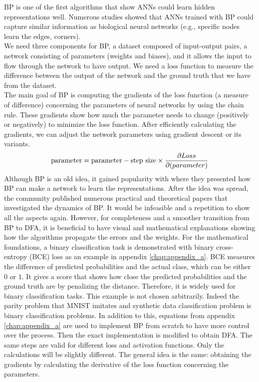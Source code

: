 \documentclass[a4paper, nobind]{templates/ociamthesis}
\begin{document}
BP is one of the first algorithms that show ANNs could learn hidden representations well. Numerous studies showed that ANNs trained with BP could capture similar information as biological neural networks (e.g., specific nodes learn the edges, corners).\\
We need three components for BP, a dataset composed of input-output pairs, a network consisting of parameters (weights and biases), and it allows the input to flow through the network to have output. We need a loss function to measure the difference between the output of the network and the ground truth that we have from the dataset.\\
The main goal of BP is computing the gradients of the loss function (a measure of difference) concerning the parameters of neural networks by using the chain rule. These gradients show how much the parameter needs to change (positively or negatively) to minimize the loss function. After efficiently calculating the gradients, we can adjust the network parameters using gradient descent or its variants.
\[
\begin{aligned} 
\text{parameter} &= \text{parameter} - \text{step size} \times \frac{\partial Loss}{\partial \text(parameter)}  \\
\end{aligned}
\]
\noindent Although BP is an old idea, it gained popularity with \cite{Rumelhart:1986we} where they presented how BP can make a network to learn the representations. After the idea was spread, the community published numerous practical and theoretical papers that investigated the dynamics of BP. It would be infeasible and a repetition to show all the aspects again. However, for completeness and a smoother transition from BP to DFA, it is beneficial to have visual and mathematical explanations showing how the algorithms propagate the errors and the weights. For the mathematical foundations, a binary classification task is demonstrated with binary cross-entropy (BCE) loss as an example in appendix \ref{chap:appendix_a}. BCE measures the difference of predicted probabilities and the actual class, which can be either \(0\) or \(1\). It gives a score that shows how close the predicted probabilities and the ground truth are by penalizing the distance. Therefore, it is widely used for binary classification tasks. This example is not chosen arbitrarily. Indeed the parity problem that MNIST imitates and synthetic data classification problem is binary classification problems. In addition to this, equations from appendix \ref{chap:appendix_a} are used to implement BP from scratch to have more control over the process. Then the exact implementation is modified to obtain DFA. The same steps are valid for different loss and activation functions. Only the calculations will be slightly different. The general idea is the same: obtaining the gradients by calculating the derivative of the loss function concerning the parameters.
\end{document}
